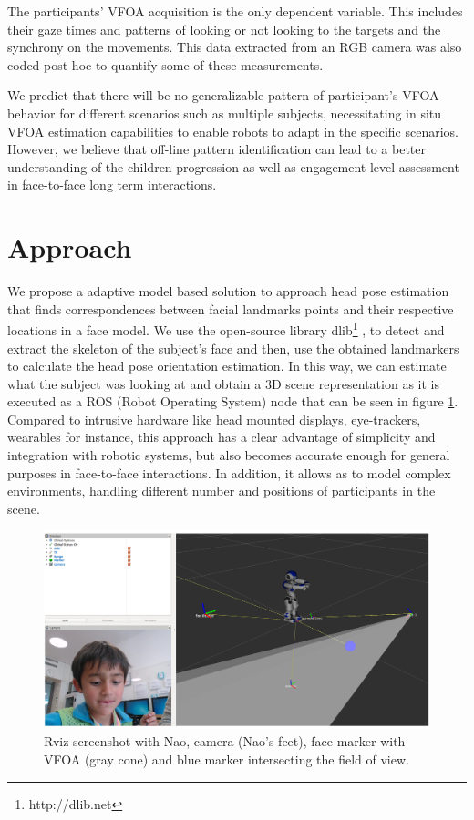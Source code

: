 \documentclass{sig-alternate}
\begin{document}
The participants' VFOA acquisition is the only dependent variable. This includes their gaze times and patterns of looking or not looking to the targets and the synchrony on the movements. This data extracted from an RGB camera was also coded post-hoc to quantify some of these measurements.

We predict that there will be no generalizable pattern of participant's VFOA behavior for different scenarios such as multiple subjects, necessitating in situ VFOA estimation capabilities to enable robots to adapt in the specific scenarios. However, we believe that off-line pattern identification can lead to a better understanding of the children progression as well as engagement level assessment in face-to-face long term interactions.

\section{Approach}

We propose a adaptive model based solution to approach head pose estimation that finds correspondences between facial landmarks points and their respective locations in a face model. We use the open-source library dlib\footnote{http://dlib.net} \cite{dlib09}, to detect and extract the skeleton of the subject's face and then, use the obtained landmarkers to calculate the head pose orientation estimation. In this way, we can estimate what the subject was looking at and obtain a 3D scene representation as it is executed as a ROS (Robot Operating System) node that can be seen in figure \ref{rviz}. Compared to intrusive hardware like head mounted displays, eye-trackers, wearables for instance, this approach has a clear advantage of simplicity and integration with robotic systems, but also becomes accurate enough for general purposes in face-to-face interactions. In addition, it allows as to model complex environments, handling different number and positions of participants in the scene.

\begin{figure}
    \centering
    \includegraphics[width=1\columnwidth]{rviz}
    \caption{\small Rviz screenshot with Nao, camera (Nao's feet), face marker with VFOA (gray cone) and blue marker intersecting the field of view.}
    \label{rviz}
\end{figure}
\end{document}
